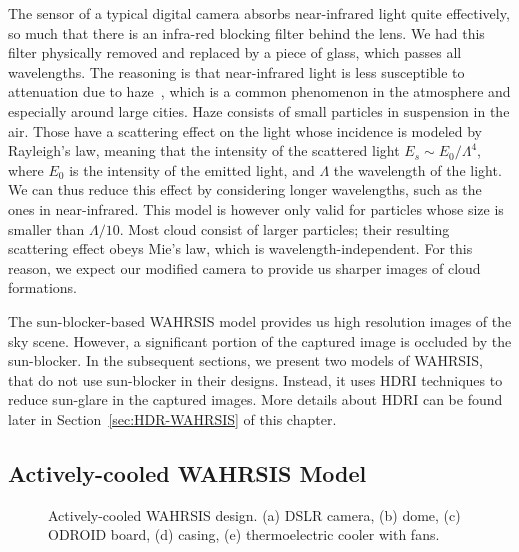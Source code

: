 The sensor of a typical digital camera absorbs near-infrared light quite effectively, so much that there is an infra-red blocking filter behind the lens. We had this filter physically removed and replaced by a piece of glass, which passes all wavelengths. The reasoning is that near-infrared light is less susceptible to attenuation due to haze~\cite{schaul2009color}, which is a common phenomenon in the atmosphere and especially around large cities. Haze consists of small particles in suspension in the air. Those have a scattering effect on the light whose incidence is modeled by Rayleigh's law, meaning that the intensity of the scattered light $E_s \sim E_0/\Lambda^4$, where $E_0$ is the intensity of the emitted light, and $\Lambda$ the wavelength of the light. We can thus reduce this effect by considering longer wavelengths, such as the ones in near-infrared. This model is however only valid for particles whose size is smaller than $\Lambda/10$. Most cloud consist of larger particles; their resulting scattering effect obeys Mie's law, which is wavelength-independent. For this reason, we expect our modified camera to provide us sharper images of cloud formations.

The sun-blocker-based WAHRSIS model provides us high resolution images of the sky scene. However, a significant portion of the captured image is occluded by the sun-blocker. In the subsequent sections, we present two models of WAHRSIS, that do not use sun-blocker in their designs. Instead, it uses HDRI techniques to reduce sun-glare in the captured images. More details about HDRI can be found later in Section~\ref{sec:HDR-WAHRSIS} of this chapter.

\subsection{Actively-cooled WAHRSIS Model} 

\begin{figure}[htbp]
\centering
{}%
\caption[Actively-cooled WAHRSIS design along with its different components.]{Actively-cooled WAHRSIS design. (a) DSLR camera, (b) dome, (c) ODROID board, (d) casing, (e) thermoelectric cooler with fans.}
\label{fig:W3-design}
\end{figure}

